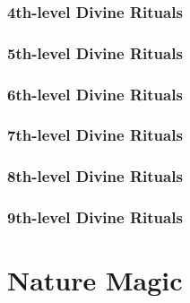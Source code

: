 \subsubsection{4th-level Divine Rituals}
\begin{rituallist}
    \SLdivination
    \SLremovecurse
    \SLsending
    \SLtongues
\end{rituallist}

\subsubsection{5th-level Divine Rituals}
\begin{rituallist}
    \SLatonement
    \SLbreakenchantment
    \SLcommune
    \SLdimensionallock
    \SLdream
    \SLresurrection
    \SLscrying
\end{rituallist}

\subsubsection{6th-level Divine Rituals}
\begin{rituallist}
    \SLfindthepath
    \SLgeasquest
    \SLplaneshift
\end{rituallist}

\subsubsection{7th-level Divine Rituals}
\begin{rituallist}
    \SLcontrolweather
    \SLinstantrefuge
\end{rituallist}

\subsubsection{8th-level Divine Rituals}
\begin{rituallist}
    \SLdiscernlocation
\end{rituallist}

\subsubsection{9th-level Divine Rituals}
\begin{rituallist}
    \SLsoulbind
\end{rituallist}

\section{Nature Magic}\label{Nature Magic}
